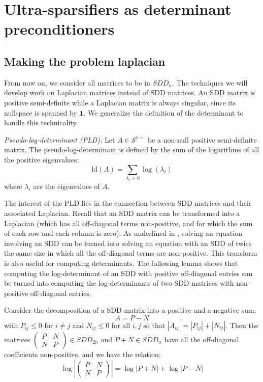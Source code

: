 
\section{Ultra-sparsifiers as determinant preconditioners}


\subsection{Making the problem laplacian}

\label{sec:Making-the-problem}

From now on, we consider all matrices to be in $SDD_{n}$. The techniques
we will develop work on Laplacian matrices instead of SDD matrices.
An SDD matrix is positive semi-definite while a Laplacian matrix is
always singular, since its nullspace is spanned by $\mathbf{1}$.
We generalize the definition of the determinant to handle this technicality. 

\begin{definition} \emph{Pseudo-log-determinant (PLD):} Let $A\in\mathcal{S}^{n+}$
be a non-null positive semi-definite matrix. The pseudo-log-determinant
is defined by the sum of the logarithms of all the positive eigenvalues:
\[
\text{ld}\left(A\right)=\sum_{\lambda_{i}>0}\log\left(\lambda_{i}\right)
\]
where $\lambda_{i}$ are the eigenvalues of $A$. \end{definition}

The interest of the PLD lies in the connection between SDD matrices
and their associated Laplacian. Recall that an SDD matrix can be transformed
into a Laplacian (which has all off-diagonal terms non-positive, and
for which the sum of each row and each column is zero). As underlined
in \cite{Gremban1996}, solving an equation involving an SDD can be
turned into solving an equation with an SDD of twice the same size
in which all the off-diagonal terms are non-positive. This transform
is also useful for computing determinants. The following lemma shows
that computing the log-determinant of an SDD with positive off-diagonal
entries can be turned into computing the log-determinants of two SDD
matrices with non-positive off-diagonal entries.

\begin{lemma}\label{non-negative-conversion}Consider the decomposition
of a SDD matrix into a positive and a negative sum:
\[
A=P-N
\]
with $P_{ij}\leq0$ for $i\neq j$ and $N_{ij}\leq0$ for all $i,j$
so that $\left|A_{ij}\right|=\left|P_{ij}\right|+\left|N_{ij}\right|$.
Then the matrices $\left(\begin{array}{cc}
P & N\\
N & P
\end{array}\right)\in SDD_{2n}$ and $P+N\in SDD_{n}$ have all the off-diagonal coefficients non-positive,
and we have the relation:
\[
\log\left|\left(\begin{array}{cc}
P & N\\
N & P
\end{array}\right)\right|=\log\left|P+N\right|+\log\left|P-N\right|
\]


\end{lemma}

